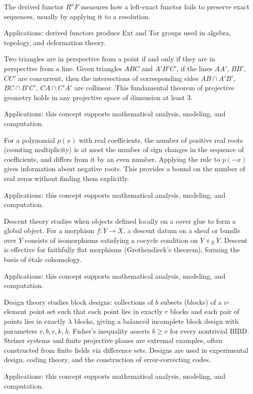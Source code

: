 The derived functor $R^nF$ measures how a left-exact functor fails to preserve exact sequences, usually by applying it to a resolution. \par\noindent Applications: derived functors produce Ext and Tor groups used in algebra, topology, and deformation theory.

Two triangles are in perspective from a point if and only if they are in perspective from a line. Given triangles $ABC$ and $A'B'C'$, if the lines $AA'$, $BB'$, $CC'$ are concurrent, then the intersections of corresponding sides $AB \cap A'B'$, $BC \cap B'C'$, $CA \cap C'A'$ are collinear. This fundamental theorem of projective geometry holds in any projective space of dimension at least 3. \par\noindent Applications: this concept supports mathematical analysis, modeling, and computation.

For a polynomial $p(x)$ with real coefficients, the number of positive real roots (counting multiplicity) is at most the number of sign changes in the sequence of coefficients, and differs from it by an even number. Applying the rule to $p(-x)$ gives information about negative roots. This provides a bound on the number of real zeros without finding them explicitly. \par\noindent Applications: this concept supports mathematical analysis, modeling, and computation.

Descent theory studies when objects defined locally on a cover glue to form a global object. For a morphism $f: Y \to X$, a descent datum on a sheaf or bundle over $Y$ consists of isomorphisms satisfying a cocycle condition on $Y \times_X Y$. Descent is effective for faithfully flat morphisms (Grothendieck's theorem), forming the basis of étale cohomology. \par\noindent Applications: this concept supports mathematical analysis, modeling, and computation.

Design theory studies block designs: collections of $b$ subsets (blocks) of a $v$-element point set such that each point lies in exactly $r$ blocks and each pair of points lies in exactly $\lambda$ blocks, giving a balanced incomplete block design with parameters $v, b, r, k, \lambda$. Fisher's inequality asserts $b \geq v$ for every nontrivial BIBD. Steiner systems and finite projective planes are extremal examples, often constructed from finite fields via difference sets. Designs are used in experimental design, coding theory, and the construction of error-correcting codes. \par\noindent Applications: this concept supports mathematical analysis, modeling, and computation.

